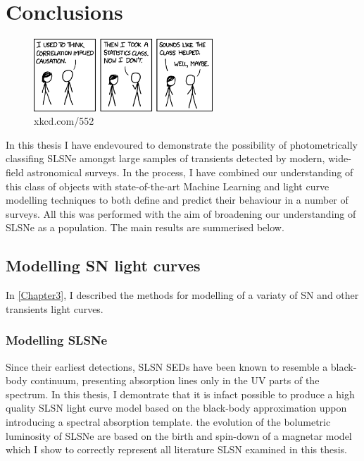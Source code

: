 \chapter{Conclusions}
\label{Chapter7}

\begin{figure}[H]
  \centering
  \includegraphics[width=0.6\textwidth]{Figures/xkcd/chapter7.png}
  \caption*{xkcd.com/552}
\end{figure}

In this thesis I have endevoured to demonstrate the possibility of photometrically classifing SLSNe amongst large samples of transients detected by modern, wide-field astronomical surveys. In the process, I have combined our understanding of this class of objects with state-of-the-art Machine Learning and light curve modelling techniques to both define and predict their behaviour in a number of surveys. All this was performed with the aim of broadening our understanding of SLSNe as a population. The main results are summerised below.

\section{Modelling SN light curves}
In \cref{Chapter3}, I described the methods for modelling of a variaty of SN and other transients light curves.

\subsection{Modelling SLSNe}
Since their earliest detections, SLSN SEDs have been known to resemble a black-body continuum, presenting absorption lines only in the UV parts of the spectrum. In this thesis, I demontrate that it is infact possible to produce a high quality SLSN light curve model based on the black-body approximation uppon introducing a spectral absorption template. the evolution of the bolumetric luminosity of SLSNe are based on the birth and spin-down of a magnetar model which I show to correctly represent all literature SLSN examined in this thesis.

